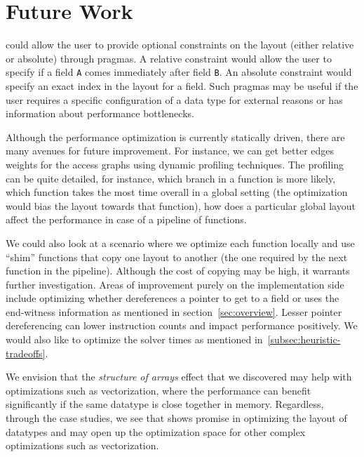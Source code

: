 \section{Future Work}
\label{sec:discussion}

\system could allow the user to provide optional constraints on the layout
(either relative or absolute) through pragmas.
A relative constraint would allow the user to specify if a field \lstinline|A| comes immediately after
field \lstinline|B|. An absolute constraint would specify an exact index in the layout for a field.
Such pragmas may be useful if the user requires a specific configuration of a data
type for external reasons or has information about performance bottlenecks.


Although the performance optimization is currently statically driven, there are many avenues for future
improvement. For instance, we can get better edges weights for the access graphs
using dynamic profiling techniques. The profiling can be quite detailed, for
instance, which branch in a function is more likely, which function takes the
most time overall in a global setting (the optimization would bias the layout
towards that function), how does a particular global layout affect the
performance in case of a pipeline of functions.

We could also look at a scenario where we optimize each function locally and 
use ``shim'' functions that copy one layout to another (the one required by the
next function in the pipeline). Although the cost of copying may be high, it warrants
further investigation. Areas of improvement purely on the implementation side include 
optimizing whether \system dereferences a pointer to get to a field or uses the end-witness
information as mentioned in section~\ref{sec:overview}. Lesser pointer dereferencing 
can lower instruction counts and impact performance positively. We would also like to 
optimize the solver times as mentioned in~\ref{subsec:heuristic-tradeoffs}.

We envision that the \textit{structure of arrays} effect that we discovered may help 
with optimizations such as vectorization, where the performance can benefit significantly
if the same datatype is close together in memory. Regardless, through the case studies, we see 
that \system shows promise in optimizing the layout of datatypes and may open up 
the optimization space for other complex optimizations such as vectorization.
